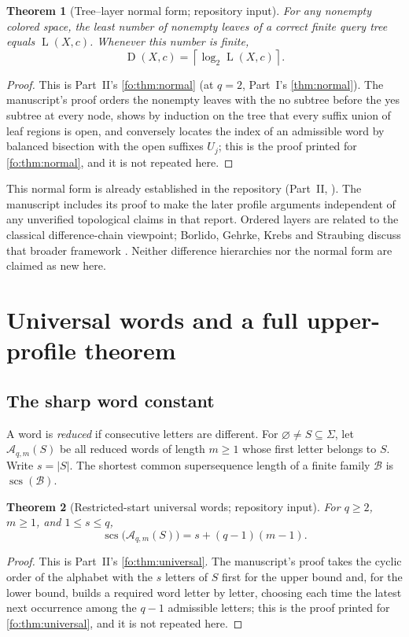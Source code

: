 \documentclass[11pt,letterpaper]{article}
\numberwithin{equation}{section}
\newtheorem{theorem}{Theorem}[section]
\theoremstyle{definition}
\theoremstyle{remark}
\theoremstyle{definition}
\newcommand{\ceil}[1]{\left\lceil#1\right\rceil}
\newcommand{\A}{\mathcal A}
\newcommand{\scs}{\operatorname{scs}}
\newcommand{\depth}{\operatorname{D}}
\newcommand{\layers}{\operatorname{L}}
\begin{document}
\begin{theorem}[Tree--layer normal form; repository input]\label{uw:thm:normal}
For any nonempty colored space, the least number of nonempty leaves of a
correct finite query tree equals $\layers(X,c)$. Whenever this number is finite,
\begin{equation}\label{uw:eq:normal}
 \depth(X,c)=\ceil{\log_2\layers(X,c)}.
\end{equation}
\end{theorem}
\begin{proof}
This is Part~II's \cref{fo:thm:normal} (at $q=2$, Part~I's \cref{thm:normal}).
The manuscript's proof orders the nonempty leaves with the no subtree before
the yes subtree at every node, shows by induction on the tree that every
suffix union of leaf regions is open, and conversely locates the index of an
admissible word by balanced bisection with the open suffixes $U_j$; this is
the proof printed for \cref{fo:thm:normal}, and it is not repeated here.
\end{proof}

This normal form is already established in the repository
(Part~II, ). The manuscript includes its proof to make the later
profile arguments independent of any unverified topological claims in that
report. Ordered layers are related to the classical difference-chain viewpoint;
Borlido, Gehrke, Krebs and Straubing discuss that broader framework
\cite{BGKS}. Neither difference hierarchies nor the normal form are claimed
as new here.

\section{Universal words and a full upper-profile theorem}\label{uw:sec:words}

\subsection{The sharp word constant}
A word is \emph{reduced} if consecutive letters are different. For
$\varnothing\ne S\subseteq\Sigma$, let $\A_{q,m}(S)$ be all reduced words
of length $m\ge1$ whose first letter belongs to $S$. Write $s=|S|$.
The shortest common supersequence length of a finite family $\mathcal B$ is
$\scs(\mathcal B)$.

\begin{theorem}[Restricted-start universal words; repository input]
\label{uw:thm:universal}
For $q\ge2$, $m\ge1$, and $1\le s\le q$,
\begin{equation}\label{uw:eq:universal}
 \scs\bigl(\A_{q,m}(S)\bigr)=s+(q-1)(m-1).
\end{equation}
\end{theorem}
\begin{proof}
This is Part~II's \cref{fo:thm:universal}. The manuscript's proof takes the
cyclic order of the alphabet with the $s$ letters of $S$ first for the upper
bound and, for the lower bound, builds a required word letter by letter,
choosing each time the latest next occurrence among the $q-1$ admissible
letters; this is the proof printed for \cref{fo:thm:universal}, and it is not
repeated here.
\end{proof}
\end{document}

